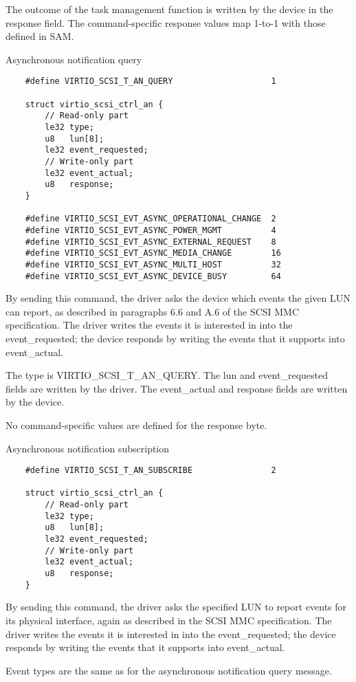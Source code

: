   The outcome of the task management function is written by the
  device in the response field. The command-specific response
  values map 1-to-1 with those defined in SAM.

  Asynchronous notification query

\begin{lstlisting}
	#define VIRTIO_SCSI_T_AN_QUERY                    1

	struct virtio_scsi_ctrl_an {
	    // Read-only part
	    le32 type;
	    u8   lun[8];
	    le32 event_requested;
	    // Write-only part
	    le32 event_actual;
	    u8   response;
	}

	#define VIRTIO_SCSI_EVT_ASYNC_OPERATIONAL_CHANGE  2
	#define VIRTIO_SCSI_EVT_ASYNC_POWER_MGMT          4
	#define VIRTIO_SCSI_EVT_ASYNC_EXTERNAL_REQUEST    8
	#define VIRTIO_SCSI_EVT_ASYNC_MEDIA_CHANGE        16
	#define VIRTIO_SCSI_EVT_ASYNC_MULTI_HOST          32
	#define VIRTIO_SCSI_EVT_ASYNC_DEVICE_BUSY         64
\end{lstlisting}

  By sending this command, the driver asks the device which
  events the given LUN can report, as described in paragraphs 6.6
  and A.6 of the SCSI MMC specification. The driver writes the
  events it is interested in into the event_requested; the device
  responds by writing the events that it supports into
  event_actual.

  The type is VIRTIO_SCSI_T_AN_QUERY. The lun and event_requested
  fields are written by the driver. The event_actual and response
  fields are written by the device.

  No command-specific values are defined for the response byte.

  Asynchronous notification subscription
\begin{lstlisting}
	#define VIRTIO_SCSI_T_AN_SUBSCRIBE                2

	struct virtio_scsi_ctrl_an {
		// Read-only part
		le32 type;
		u8   lun[8];
		le32 event_requested;
		// Write-only part
		le32 event_actual;
		u8   response;
	}
\end{lstlisting}

  By sending this command, the driver asks the specified LUN to
  report events for its physical interface, again as described in
  the SCSI MMC specification. The driver writes the events it is
  interested in into the event_requested; the device responds by
  writing the events that it supports into event_actual.

  Event types are the same as for the asynchronous notification
  query message.

